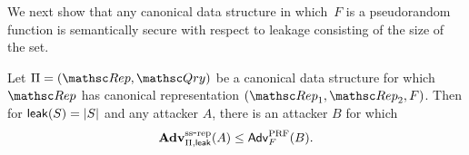 We next show that any canonical data structure in which~$F$ is a pseudorandom function is
semantically secure with respect to leakage consisting of the size of the set.

\begin{theorem}\label{thm:priv-ss}
Let $\setprim=(\Rep, \Qry)$ be a canonical data structure for which $\Rep$
has canonical representation
$(\Rep_1, \Rep_2, F)$. Then for ${\sf leak}(S) = |S|$ and
any attacker $A$, there is an attacker
$B$  for which
\[\mathrm{\mathbf{Adv}}^{\mathrm{ss\mbox{-}rep}}_{\Pi,{\sf leak}}(A) \leq {\sf Adv}_F^{\rm PRF}(B). \]
\end{theorem}
